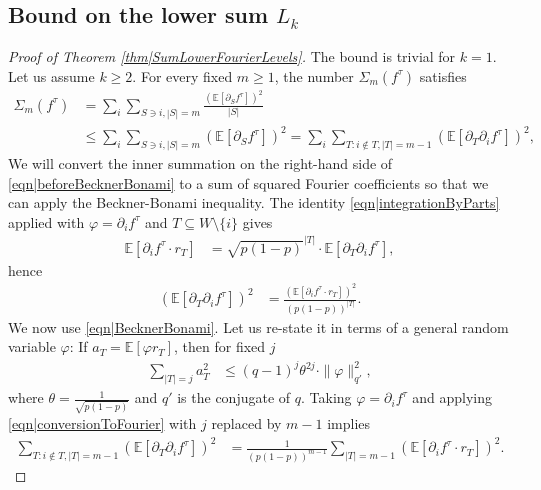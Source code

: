 \documentclass[reqno]{amsart}
\begin{document}
\subsection{Bound on the lower sum $L_k$}\label{subs|ProofLk} 
\begin{proof}[Proof of Theorem \ref{thm|SumLowerFourierLevels}]
The bound is trivial for $k=1$. Let us assume $k\geq 2$. For every fixed $m\geq 1$, the number $\Sigma_m(f^{\tau})$ satisfies
\begin{align}
\Sigma_m(f^{\tau})&=\sum_i \sum_{S\ni i, |S|=m}\frac{\left(\mathbb E\left[\partial_Sf^{\tau}\right]\right)^2}{|S|} \nonumber\\
&\leq \sum_i \sum_{S\ni i, |S|=m} \left(\mathbb E\left[\partial_Sf^{\tau}\right]\right)^2
=\sum_i \sum_{T:i\not \in T, |T|=m-1} \left(\mathbb E\left[\partial_T\partial_i f^{\tau}\right]\right)^2,
\label{eqn|beforeBecknerBonami}
\end{align}
We will convert the inner summation on the right-hand side of \eqref{eqn|beforeBecknerBonami} to a sum of squared Fourier coefficients so that we can apply the Beckner-Bonami inequality. 
The identity \eqref{eqn|integrationByParts} applied with $\varphi=\partial_i f^{\tau}$ and $T\subseteq W\setminus\{i\}$ gives
\begin{align*}
\mathbb E\left[\partial_i f^{\tau}\cdot r_T\right]&=\sqrt{p(1-p)}^{|T|}\cdot \mathbb E\left[\partial_T\partial_i f^{\tau}\right],
\end{align*}
hence
\begin{align}
\left(\mathbb E\left[\partial_T\partial_i f^{\tau}\right]\right)^2 &=\frac{\left(\mathbb E\left[\partial_i f^{\tau}\cdot r_T\right]\right)^2}{(p(1-p))^{|T|}}.
\label{eqn|conversionToFourier}
\end{align}
We now use \eqref{eqn|BecknerBonami}. Let us re-state it in terms of a general random variable $\varphi$: If $a_T=\mathbb E[\varphi r_T]$, then for fixed $j$
\begin{align}
\sum_{|T|=j} a_T^2 &\leq (q-1)^j\theta^{2j}\cdot \|\varphi\|_{q'}^2, \label{eqn|BecknerBonamiVarphi}
\end{align}
where $\theta=\frac1{\sqrt{p(1-p)}}$ and $q'$ is the conjugate of $q$. Taking $\varphi=\partial_i f^{\tau}$ and applying 
\eqref{eqn|conversionToFourier} with $j$ replaced by $m-1$ implies 
\begin{align}
\sum_{T:i\not\in T, |T|=m-1} \left(\mathbb E\left[\partial_T\partial_i f^{\tau}\right]\right)^2
&=\frac{1}{(p(1-p))^{m-1}}\sum_{|T|=m-1} \left(\mathbb E\left[\partial_i f^{\tau}\cdot r_T\right]\right)^2.

\end{align}
\end{proof}
\end{document}

